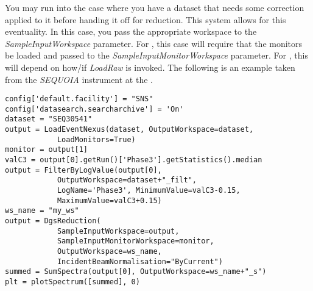 You may run into the case where you have a dataset that needs some correction applied to it before handing it off for reduction. This system allows for this eventuality. In this case, you pass the appropriate workspace to the \textit{SampleInputWorkspace} parameter. For \sns{}, this case will require that the monitors be loaded and passed to the \textit{SampleInputMonitorWorkspace} parameter. For \isis{}, this will depend on how/if \textit{LoadRaw} is invoked. The following is an example taken from the \textit{SEQUOIA} instrument at the \sns{}. 
\begin{verbatim}
config['default.facility'] = "SNS"
config['datasearch.searcharchive'] = 'On'
dataset = "SEQ30541"
output = LoadEventNexus(dataset, OutputWorkspace=dataset, 
            LoadMonitors=True)
monitor = output[1]
valC3 = output[0].getRun()['Phase3'].getStatistics().median
output = FilterByLogValue(output[0], 
            OutputWorkspace=dataset+"_filt", 
            LogName='Phase3', MinimumValue=valC3-0.15, 
            MaximumValue=valC3+0.15)
ws_name = "my_ws"
output = DgsReduction(
            SampleInputWorkspace=output,
            SampleInputMonitorWorkspace=monitor,
            OutputWorkspace=ws_name,
            IncidentBeamNormalisation="ByCurrent")
summed = SumSpectra(output[0], OutputWorkspace=ws_name+"_s")
plt = plotSpectrum([summed], 0)            
\end{verbatim}